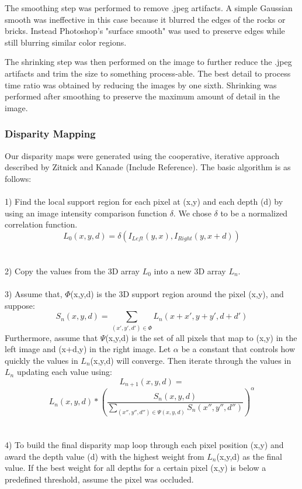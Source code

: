 \documentclass[a4paper,twoside]{article}
\begin{document}
The smoothing step was performed to remove .jpeg artifacts.
  A simple Gaussian smooth was ineffective in this case because it blurred the edges of the rocks or bricks.
  Instead Photoshop's "surface smooth" was used to preserve edges while still blurring similar color regions.

The shrinking step was then performed on the image to further reduce the .jpeg artifacts and trim the size to something process-able.  
The best detail to process time ratio was obtained by reducing the images by one sixth.   
Shrinking was performed after smoothing to preserve the maximum amount of detail in the image.  


\subsubsection{Disparity Mapping}
\label{subsec:disparity_mapping}

Our disparity maps were generated using the cooperative, iterative approach described by Zitnick and Kanade (Include Reference).  
The basic algorithm is as follows:
\\ \\
1) Find the local support region for each pixel at (x,y) and each depth (d) by using an image intensity comparison function \(\delta\).  We chose \(\delta\) to be a normalized correlation function.
\[L_0(x,y,d) = \delta(I_{Left}(y,x),I_{Right}(y,x+d))\]
\\ \\
2) Copy the values from the 3D array \(L_0\) into a new 3D array \(L_n\).
\\ \\
3) Assume that, \(\Phi\)(x,y,d) is the 3D support region around the pixel (x,y), and suppose:
\[S_n(x,y,d) = \sum_{(x',y',d') \in \Phi} L_n (x+x', y+y', d+d') \]
Furthermore, assume that \(\Psi\)(x,y,d) is the set of all pixels that map to (x,y) in the left image and (x+d,y) in the right image. 
Let \(\alpha\) be a constant that controls how quickly the values in \(L_n\)(x,y,d) will converge.  
Then iterate through the values in \(L_n\) updating each value using: 
\[L_{n+1}(x,y,d) = \]
\[L_n(x,y,d)*\left(  \frac{S_n(x,y,d)}{\sum\limits_{(x'',y'',d'') \in \Psi(x,y,d)} S_n(x'',y'',d'')} \right)^\alpha \]
\\ \\
4) To build the final disparity map loop through each pixel position (x,y) and award the depth value (d) with the highest weight from \(L_n\)(x,y,d) as the final value.
If the best weight for all depths for a certain pixel (x,y) is below a predefined threshold, assume the pixel was occluded.
\end{document}
